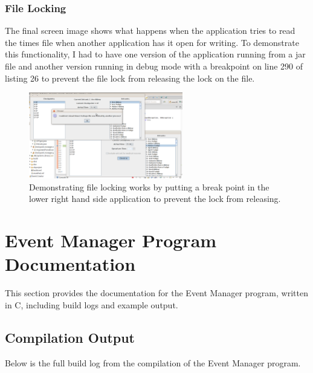 \documentclass{article}
\begin{document}
\subsubsection{File Locking}
The final screen image shows what happens when the application tries to read the times file when another application has it open for writing. To demonstrate this functionality, I had to have one version of the application running from a jar file and another version running in debug mode with a breakpoint on line 290 of listing 26 to prevent the file lock from releasing the lock on the file.

\begin{figure}[H]
\centering
\includegraphics[width=0.6\textwidth]{img/GUI-test/file-lock.png}
\caption{Demonstrating file locking works by putting a break point in the lower right hand side application to prevent the lock from releasing.}
\label{fig:file-lock}
\end{figure}

\section{Event Manager Program Documentation}
This section provides the documentation for the Event Manager program, written in C, including build logs and example output.

\subsection{Compilation Output}
Below is the full build log from the compilation of the Event Manager program.
\end{document}
